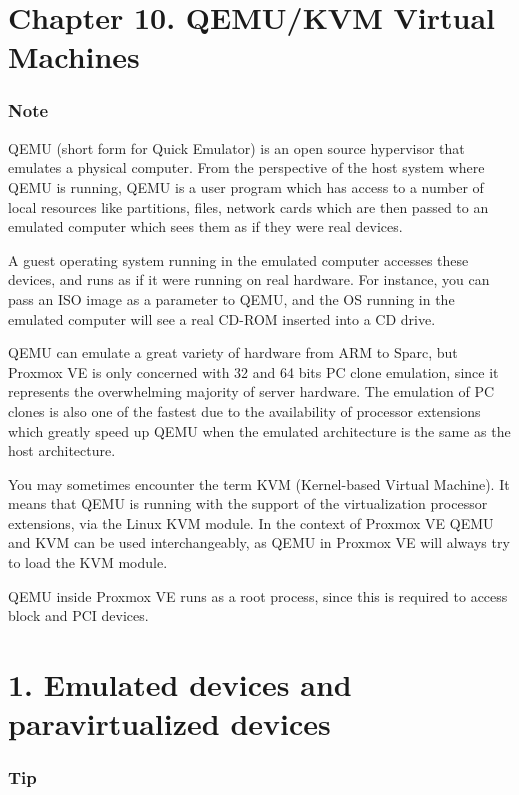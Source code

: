 \section{Chapter 10. QEMU/KVM Virtual Machines}

\subsubsection{Note}

QEMU (short form for Quick Emulator) is an open source hypervisor that emulates a physical computer. From the perspective of the host system where QEMU is running, QEMU is a user program which has access to a number of local resources like partitions, files, network cards which are then passed to an emulated computer which sees them as if they were real devices.

A guest operating system running in the emulated computer accesses these devices, and runs as if it were running on real hardware. For instance, you can pass an ISO image as a parameter to QEMU, and the OS running in the emulated computer will see a real CD-ROM inserted into a CD drive.

QEMU can emulate a great variety of hardware from ARM to Sparc, but Proxmox VE is only concerned with 32 and 64 bits PC clone emulation, since it represents the overwhelming majority of server hardware. The emulation of PC clones is also one of the fastest due to the availability of processor extensions which greatly speed up QEMU when the emulated architecture is the same as the host architecture.

You may sometimes encounter the term KVM (Kernel-based Virtual Machine). It means that QEMU is running with the support of the virtualization processor extensions, via the Linux KVM module. In the context of Proxmox VE QEMU and KVM can be used interchangeably, as QEMU in Proxmox VE will always try to load the KVM module.

QEMU inside Proxmox VE runs as a root process, since this is required to access block and PCI devices.


\section{1. Emulated devices and paravirtualized devices}

\subsubsection{Tip}

